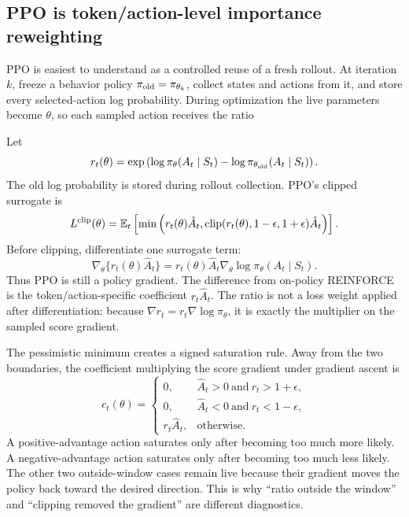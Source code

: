 \documentclass[11pt]{article}
\newcommand{\E}{\mathbb E}
\begin{document}
\subsection{PPO is token/action-level importance reweighting}

PPO is easiest to understand as a controlled reuse of a fresh rollout.  At
iteration $k$, freeze a behavior policy $\pi_{\rm old}=\pi_{\theta_k}$,
collect states and actions from it, and store every selected-action log
probability.  During optimization the live parameters become $\theta$, so
each sampled action receives the ratio

Let
\begin{equation}
r_t(\theta)=\exp\left(
\log\pi_\theta(A_t\mid S_t)-\log\pi_{\theta_{\rm old}}(A_t\mid S_t)
\right).
\end{equation}
The old log probability is stored during rollout collection. PPO's clipped
surrogate is
\begin{equation}
L^{\rm clip}(\theta)=\E_t\left[
\min\left(r_t(\theta)\hat A_t,
\operatorname{clip}(r_t(\theta),1-\epsilon,1+\epsilon)\hat A_t\right)
\right].
\end{equation}
Before clipping, differentiate one surrogate term:
\begin{equation}
\nabla_\theta\{r_t(\theta)\hat A_t\}
=r_t(\theta)\hat A_t\nabla_\theta
\log\pi_\theta(A_t\mid S_t).
\end{equation}
Thus PPO is still a policy gradient.  The difference from on-policy REINFORCE
is the token/action-specific coefficient $r_t\hat A_t$.  The ratio is not a
loss weight applied after differentiation: because $\nabla r_t=r_t\nabla
\log\pi_\theta$, it is exactly the multiplier on the sampled score gradient.

The pessimistic minimum creates a signed saturation rule.  Away from the two
boundaries, the coefficient multiplying the score gradient under gradient
ascent is
\begin{equation}
c_t(\theta)=
\begin{cases}
0,&\hat A_t>0\ \text{and}\ r_t>1+\epsilon,\\
0,&\hat A_t<0\ \text{and}\ r_t<1-\epsilon,\\
r_t\hat A_t,&\text{otherwise}.
\end{cases}
\end{equation}
A positive-advantage action saturates only after becoming too much more likely.
A negative-advantage action saturates only after becoming too much less likely.
The other two outside-window cases remain live because their gradient moves the
policy back toward the desired direction.  This is why ``ratio outside the
window'' and ``clipping removed the gradient'' are different diagnostics.
\end{document}
